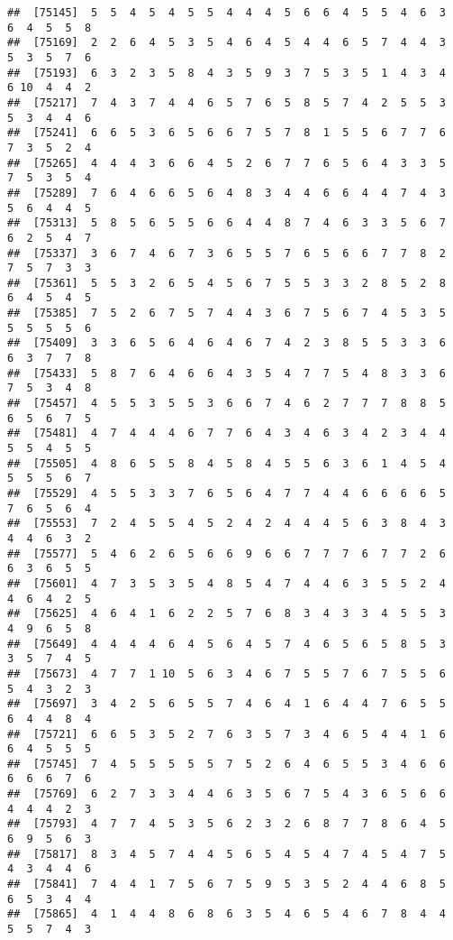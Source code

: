 \documentclass[
]{book}
\begin{document}
\begin{verbatim}
##  [75145]  5  5  4  5  4  5  5  4  4  4  5  6  6  4  5  5  4  6  3  6  4  5  5  8
##  [75169]  2  2  6  4  5  3  5  4  6  4  5  4  4  6  5  7  4  4  3  5  3  5  7  6
##  [75193]  6  3  2  3  5  8  4  3  5  9  3  7  5  3  5  1  4  3  4  6 10  4  4  2
##  [75217]  7  4  3  7  4  4  6  5  7  6  5  8  5  7  4  2  5  5  3  5  3  4  4  6
##  [75241]  6  6  5  3  6  5  6  6  7  5  7  8  1  5  5  6  7  7  6  7  3  5  2  4
##  [75265]  4  4  4  3  6  6  4  5  2  6  7  7  6  5  6  4  3  3  5  7  5  3  5  4
##  [75289]  7  6  4  6  6  5  6  4  8  3  4  4  6  6  4  4  7  4  3  5  6  4  4  5
##  [75313]  5  8  5  6  5  5  6  6  4  4  8  7  4  6  3  3  5  6  7  6  2  5  4  7
##  [75337]  3  6  7  4  6  7  3  6  5  5  7  6  5  6  6  7  7  8  2  7  5  7  3  3
##  [75361]  5  5  3  2  6  5  4  5  6  7  5  5  3  3  2  8  5  2  8  6  4  5  4  5
##  [75385]  7  5  2  6  7  5  7  4  4  3  6  7  5  6  7  4  5  3  5  5  5  5  5  6
##  [75409]  3  3  6  5  6  4  6  4  6  7  4  2  3  8  5  5  3  3  6  6  3  7  7  8
##  [75433]  5  8  7  6  4  6  6  4  3  5  4  7  7  5  4  8  3  3  6  7  5  3  4  8
##  [75457]  4  5  5  3  5  5  3  6  6  7  4  6  2  7  7  7  8  8  5  6  5  6  7  5
##  [75481]  4  7  4  4  4  6  7  7  6  4  3  4  6  3  4  2  3  4  4  5  5  4  5  5
##  [75505]  4  8  6  5  5  8  4  5  8  4  5  5  6  3  6  1  4  5  4  5  5  5  6  7
##  [75529]  4  5  5  3  3  7  6  5  6  4  7  7  4  4  6  6  6  6  5  7  6  5  6  4
##  [75553]  7  2  4  5  5  4  5  2  4  2  4  4  4  5  6  3  8  4  3  4  4  6  3  2
##  [75577]  5  4  6  2  6  5  6  6  9  6  6  7  7  7  6  7  7  2  6  6  3  6  5  5
##  [75601]  4  7  3  5  3  5  4  8  5  4  7  4  4  6  3  5  5  2  4  4  6  4  2  5
##  [75625]  4  6  4  1  6  2  2  5  7  6  8  3  4  3  3  4  5  5  3  4  9  6  5  8
##  [75649]  4  4  4  4  6  4  5  6  4  5  7  4  6  5  6  5  8  5  3  3  5  7  4  5
##  [75673]  4  7  7  1 10  5  6  3  4  6  7  5  5  7  6  7  5  5  6  5  4  3  2  3
##  [75697]  3  4  2  5  6  5  5  7  4  6  4  1  6  4  4  7  6  5  5  6  4  4  8  4
##  [75721]  6  6  5  3  5  2  7  6  3  5  7  3  4  6  5  4  4  1  6  6  4  5  5  5
##  [75745]  7  4  5  5  5  5  5  7  5  2  6  4  6  5  5  3  4  6  6  6  6  6  7  6
##  [75769]  6  2  7  3  3  4  4  6  3  5  6  7  5  4  3  6  5  6  6  4  4  4  2  3
##  [75793]  4  7  7  4  5  3  5  6  2  3  2  6  8  7  7  8  6  4  5  6  9  5  6  3
##  [75817]  8  3  4  5  7  4  4  5  6  5  4  5  4  7  4  5  4  7  5  4  3  4  4  6
##  [75841]  7  4  4  1  7  5  6  7  5  9  5  3  5  2  4  4  6  8  5  6  5  3  4  4
##  [75865]  4  1  4  4  8  6  8  6  3  5  4  6  5  4  6  7  8  4  4  5  5  7  4  3

\end{verbatim}
\end{document}
